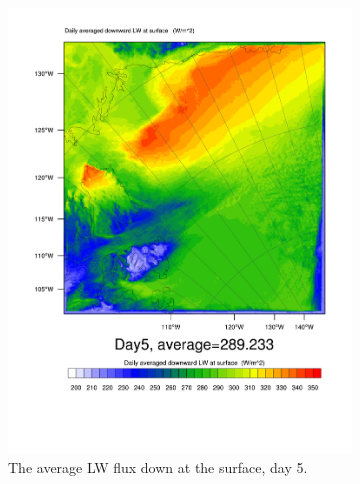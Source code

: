 \begin{figure}
	\begin{subfigure}{0.48\textwidth}
		\centering
		\includegraphics[width=\textwidth]{results/control/GLW_Day5.pdf}
		\caption{The average LW flux down at the surface, day 5.}
		\label{subfig:glw_r1Day5}
	\end{subfigure}
	\quad
	\begin{subfigure}{0.48\textwidth}
		\centering

\end{subfigure}
\end{figure}
